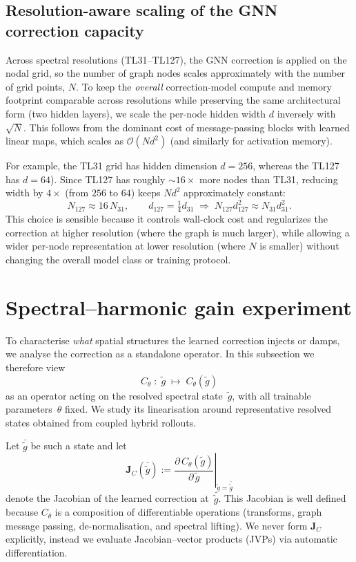 \subsection{Resolution-aware scaling of the GNN correction capacity}
\label{sec:gnn_scaling}
Across spectral resolutions (TL31--TL127), the GNN correction is applied on the nodal grid, so the number of graph nodes scales approximately with the number of grid points, \(N\).
To keep the \emph{overall} correction-model compute and memory footprint comparable across resolutions while preserving the same architectural form (two hidden layers), we scale the per-node hidden width \(d\) inversely with \(\sqrt{N}\).
This follows from the dominant cost of message-passing blocks with learned linear maps, which scales as \(\mathcal{O}(N d^{2})\) (and similarly for activation memory).

For example, the TL31 grid has hidden dimension \(d=256\), whereas the TL127 has \(d=64\)).
Since TL127 has roughly \(\sim 16\times\) more nodes than TL31, reducing width by \(4\times\) (from \(256\) to \(64\)) keeps \(N d^{2}\) approximately constant:
\[
N_{127} \approx 16\,N_{31}, \qquad d_{127} = \tfrac{1}{4} d_{31}
\;\Rightarrow\;
N_{127} d_{127}^{2} \approx N_{31} d_{31}^{2}.
\]
This choice is sensible because it controls wall-clock cost and regularizes the correction at higher resolution (where the graph is much larger), while allowing a wider per-node representation at lower resolution (where \(N\) is smaller) without changing the overall model class or training protocol.

\section{Spectral--harmonic gain experiment}
\label{sec:gain-experiment}

To characterise \emph{what} spatial structures the learned correction injects
or damps, we analyse the correction as a standalone operator.  In this
subsection we therefore view
\[
  C_{\theta} \;:\; \tilde{g} \;\mapsto\; C_{\theta}(\tilde{g})
\]
as an operator acting on the resolved spectral state~$\tilde{g}$, with
all trainable parameters~$\theta$ fixed.  We study its linearisation
around representative resolved states obtained from coupled hybrid
rollouts.

Let $\bar{\tilde{g}}$ be such a state and let
\begin{equation}
  \mathbf{J}_{C}(\bar{\tilde{g}})
  :=
  \left.
    \frac{\partial\, C_{\theta}(\tilde{g})}
         {\partial\, \tilde{g}}
  \right|_{\tilde{g}=\bar{\tilde{g}}}
\end{equation}
denote the Jacobian of the learned correction at~$\bar{\tilde{g}}$.
This Jacobian is well defined because $C_{\theta}$ is a composition of
differentiable operations (transforms, graph message passing,
de-normalisation, and spectral lifting).  We never form
$\mathbf{J}_{C}$ explicitly, instead we evaluate Jacobian--vector
products (JVPs) via automatic differentiation.

